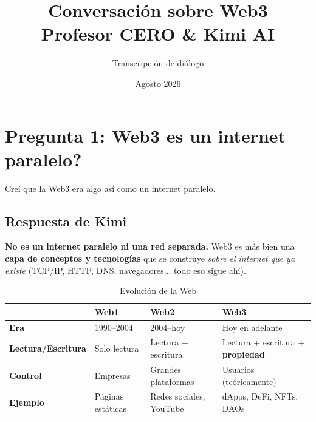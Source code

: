 \documentclass[12pt,a4paper]{article}
\title{\textbf{Conversación sobre Web3}\\
\large Profesor CERO \& Kimi AI}
\author{Transcripción de diálogo}
\date{Agosto 2026}
\begin{document}
\maketitle

\tableofcontents
\newpage

\section{Pregunta 1: \textquestiondown Web3 es un internet paralelo?}

\begin{tcolorbox}[colback=blue!5!white,colframe=blue!75!black,title={\textbf{Pregunta del Profesor CERO}}]
Cre\'{i} que la Web3 era algo as\'{i} como un internet paralelo.
\end{tcolorbox}

\subsection{Respuesta de Kimi}

\textbf{No es un internet paralelo ni una red separada.} Web3 es m\'{a}s bien una \textbf{capa de conceptos y tecnolog\'{i}as} que se construye \textit{sobre el internet que ya existe} (TCP/IP, HTTP, DNS, navegadores... todo eso sigue ah\'{i}).

\begin{table}[h]
\centering
\begin{tabular}{|l|l|l|l|}
\hline
\textbf{} & \textbf{Web1} & \textbf{Web2} & \textbf{Web3} \\
\hline
\textbf{Era} & 1990--2004 & 2004--hoy & Hoy en adelante \\
\hline
\textbf{Lectura/Escritura} & Solo lectura & Lectura + escritura & Lectura + escritura + \textbf{propiedad} \\
\hline
\textbf{Control} & Empresas & Grandes plataformas & Usuarios (te\'{o}ricamente) \\
\hline
\textbf{Ejemplo} & P\'{a}ginas est\'{a}ticas & Redes sociales, YouTube & dApps, DeFi, NFTs, DAOs \\
\hline
\end{tabular}
\caption{Evoluci\'{o}n de la Web}
\end{table}
\end{document}
